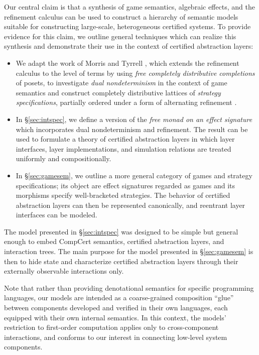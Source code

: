 \documentclass[draft,11pt]{report}
\begin{document}
Our central claim is that a synthesis
of %
game semantics, algebraic effects, and the refinement calculus
can be used to construct a hierarchy of semantic models
suitable for constructing large-scale, heterogeneous certified systems.
To provide evidence for this claim,
we outline general techniques
which can realize this synthesis
and demonstrate their use
in the context of certified abstraction layers:
\begin{itemize}
\item
  We adapt the work of Morris and Tyrrell \cite{augtyp,dndf},
  which extends the refinement calculus to the level of terms
  by using \emph{free completely distributive completions} of posets,
  to investigate \emph{dual nondeterminism}
  in the context of game semantics
  and construct
  completely distributive lattices of
  \emph{strategy specifications},
  partially ordered
  under a form of alternating refinement
  \cite{altref}.
\item
  In \S\ref{sec:intspec},
  we define a version of the
  \emph{free monad on an effect signature}
  which incorporates dual nondeterminism and refinement.
  The result can be used to formulate a theory of certified abstraction
  layers in which
  layer interfaces, layer implementations, and simulation relations
  are treated uniformly and compositionally.
\item
  In \S\ref{sec:gamesem},
  we outline a more general category of games and
  strategy specifications;
  its object are effect signatures regarded as games
  and its morphisms specify well-bracketed strategies.
  The behavior of certified abstraction layers
  can then be represented canonically,
  and reentrant layer interfaces can be modeled.
\end{itemize}

The model presented in \S\ref{sec:intspec} was designed to be simple but
general enough to embed CompCert semantics, certified
abstraction layers, and interaction trees. The main purpose for
the model presented in \S\ref{sec:gamesem} is then to hide state and
characterize certified abstraction layers through
their externally observable interactions only.

Note that rather than providing
denotational semantics for specific programming
languages, our models are intended as a coarse-grained composition
``glue'' between components developed and verified in their own
languages, each equipped with their own internal semantics.
In this context,
the models' restriction to first-order computation
applies only to cross-component interactions,
and conforms to our interest in connecting
low-level system components.
\end{document}
